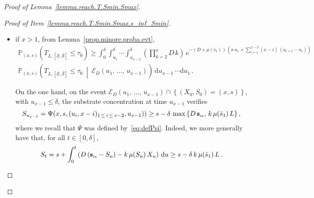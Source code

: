 \documentclass[AHL,Unicode,longabstracts,published]{cedram}
\newcommand{\PP}{\mathbb{P}}
\newcommand{\clE}{\mathcal{E}}
\newcommand{\Sin}{{\mathbf s}_{\textrm{\tiny\rm in}}}
\newcommand{\dif}{\mathrm{d}}
\newcommand{\Smin}{\underline{\mathcal{S}}}
\newcommand{\Smax}{\bar{\mathcal{S}}}
\newcommand{\barmu}{\mu(\bar s_1)}
\newcommand{\phit}{\phi_\textsf{t}^{-1}}
\newcommand{\1}{\mathbf{1}}
\begin{document}
\begin{proof}[Proof of Lemma~\ref{lemma.reach.T.Smin.Smax}]
\begin{proof}[{Proof of Item~\eqref{lemma.reach.T.Smin.Smax.s_inf_Smin}}]
\begin{itemize}
\begin{align*}
&\leq \phit \Big(1,s-\delta\,\max\left\{D\,\Sin,\,k\,\barmu\,L\right\},s\Big)+\phit \Big(1,s,\Smin\Big)
\\
&\leq T+\phit \Big(1,s,\Smin\Big) = \tau_0 - \delta\,.
\end{align*}
Then, since from Lemma~\ref{lem:rapprochement} $t\mapsto \phi(1, s_0,t)$ is increasing,
\begin{align*}
\phi(1,s_0,\tau_0-\delta) &\geq \phi\left(1,s_0,\phit\left(1, s_0,\Smin \right)\right)=\Smin\,.
\end{align*}
On the event $\{(X_0,S_0)=(1,s_0), \, T_1> \tau_0-\delta \}$, we then have $S_{\tau_0-\delta} \geq \Smin$ a.s. Since $(S_t)_{t\,\geq\,0}$ is a continuous process, from the intermediate value theorem, $(S_t)_{t\,\geq \,0}$ reaches $\Smin$ in the time interval $[0,\tau_0-\delta]$. Moreover, since $\Smin<\bar s_1$ then
\[
\PP_{(1,s_0)}
\left(T_{L,[\Smin,\Smax]}\leq \tau_0-\delta \, \middle| \, T_1> \tau_0-\delta\right)=1
\]
and therefore
\begin{align}\label{eq.reach.Smin.Smax.befor.tmax.x1}
\PP_{(1,s_0)}\left(T_{L,[\Smin,\Smax]}\leq \tau_0-\delta \right) &\geq e^{-(D+\barmu)\,(\tau_0-\delta)}\,.
\end{align}
Since $\PP_{(1,s)}(T_{L,[\Smin,\Smax]}\leq \tau_0) \geq \PP_{(1,s)}(T_{L,[\Smin,\Smax]}\leq \tau_0-\delta)$, taking $s_0=s$ leads to the result.

\item if $x>1$, from Lemma~\ref{prop.minore.proba.evt},
\begin{multline*}
\PP_{(x,s)}\left(T_{L,[\Smin,\Smax]}\leq \tau_0\right) \geq
\int_0^{\delta} \int_{u_1}^{\delta}\cdots \int_{u_{x-2}}^{\delta}
\left(\prod_{k=2}^{x}D\,k\right)\, e^{-(D+\barmu)\,\left(x\,u_1+\sum\limits_{i=1}^{x-2}(x-i)\,(u_{i+1}-u_{i})\right)}
\\
\PP_{(x,s)}
\left(T_{L,[\Smin,\Smax]}\leq\tau_0 \ \middle| \
\clE_D\left(u_1,\,\dots,\,u_{x-1}\right) \right)\,
\dif u_{x-1}\,\cdots \dif u_1\,.
\end{multline*}

On the one hand, on the event $\clE_D(u_1,\,\dots,\,u_{x-1})\cap \left\{(X_0,S_0)=(x,s)\right\}$, with $u_{x-1} \leq \delta$, the substrate concentration at time $u_{x-1}$ verifies
\[
S_{u_{x-1}}=\Psi(x,s,(u_i,x-i)_{1\,\leq\,i\,\leq\,x-2},u_{x-1}))\geq s-\delta\,\max\left\{D\,\Sin,\,k\,\barmu\,L\right\},
\]
where we recall that $\Psi$ was defined by~\eqref{eq:defPsi}. Indeed, we more generally have that, for all $t \in [0,\delta]$,
\[
S_t = s + \int_0^t \left(D\,(\Sin-S_u)-k\,\mu(S_u)\,X_u\right)\,\dif u
\geq s-\delta\,k\,\barmu\,L\,.
\]


\end{itemize}
\end{proof}
\end{proof}
\end{document}
